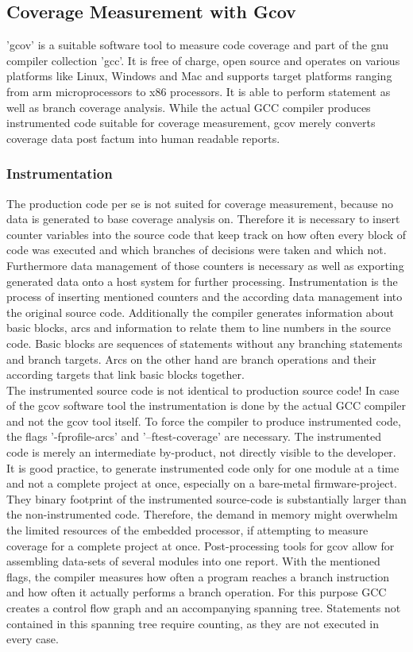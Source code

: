 			
			\subsection{Coverage Measurement with Gcov}
				'gcov' is a suitable software tool to measure code coverage and part of the gnu compiler collection 'gcc'. It is free of charge, open source and operates on various platforms like Linux, Windows and Mac and supports target platforms ranging from arm microprocessors to x86 processors. It is able to perform statement as well as branch coverage analysis. While the actual GCC compiler produces instrumented code suitable for coverage measurement, gcov merely converts coverage data post factum into human readable reports.
			\subsubsection{Instrumentation}
				The production code per se is not suited for coverage measurement, because no data is generated to base coverage analysis on. Therefore it is necessary to insert counter variables into the source code that keep track on how often every block of code was executed and which branches of decisions were taken and which not. Furthermore data management of those counters is necessary as well as exporting generated data onto a host system for further processing. Instrumentation is the process of inserting mentioned counters and the according data management into the original source code. Additionally the compiler generates information about basic blocks, arcs and information to relate them to line numbers in the source code. Basic blocks are sequences of statements without any branching statements and branch targets. Arcs on the other hand are branch operations and their according targets that link basic blocks together. \\
				
				The instrumented source code is not identical to production source code! In case of the gcov software tool the instrumentation is done by the actual GCC compiler and not the gcov tool itself. To force the compiler to produce instrumented code, the flags '-fprofile-arcs' and '–ftest-coverage' are necessary. The instrumented code is merely an intermediate by-product, not directly visible to the developer. It is good practice, to generate instrumented code only for one module at a time and not a complete project at once, especially on a bare-metal firmware-project. They binary footprint of the instrumented source-code is substantially larger than the non-instrumented code. Therefore, the demand in memory might overwhelm the limited resources of the embedded processor, if attempting to measure coverage for a complete project at once. Post-processing tools for gcov allow for assembling data-sets of several modules into one report. With the mentioned flags, the compiler measures how often a program reaches a branch instruction and how often it actually performs a branch operation. For this purpose GCC creates a control flow graph and an accompanying spanning tree. Statements not contained in this spanning tree require counting, as they are not executed in every case. \\
				
